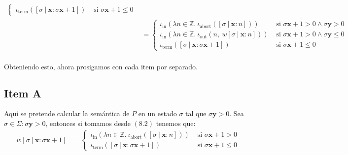 \documentclass{article}
\newcommand{\Z}{\mathbb{Z}}
\newcommand{\x}{\textbf{x}}
\newcommand{\y}{\textbf{y}}
\newcommand{\iterm}[1]{\iota_\text{term}\left(#1\right)}
\newcommand{\iabort}[1]{\iota_\text{abort}\left(#1\right)}
\newcommand{\iout}[2]{\iota_\text{out}\left(#1,\ #2\right)}
\newcommand{\iin}[2]{\iota_\text{in}\left(\lambda #1 \in \Z .\ #2\right)}
\begin{document}
\begin{equation}
\begin{aligned}
\begin{cases}
      \iterm{[\sigma\ |\ \x : \sigma\x+1]} &\text{ si }\sigma\x+1 \leq 0
    \end{cases} \\ 
    &= \begin{cases}
      \iin{n}{\iabort{[\sigma\ |\ \x : n]}} &\text{ si }\sigma\x+1 > 0 \land \sigma\y > 0 \\ 
      \iin{n}{\iout{n}{w [\sigma\ |\ \x : n]}} &\text{ si }\sigma\x+1 > 0 \land \sigma\y \leq 0 \\ 
      \iterm{[\sigma\ |\ \x : \sigma\x+1]} &\text{ si }\sigma\x+1 \leq 0
    \end{cases} \\ 
  \end{aligned}
\end{equation}

Obteniendo esto, ahora prosigamos con cada item por separado.

\subsection*{Item A}
Aquí se pretende calcular la semántica de $P$ en un estado $\sigma$ tal que $\sigma\y > 0$.
Sea $\sigma \in \Sigma : \sigma\y > 0$, entonces si tomamos desde $(8.2)$ tenemos que:
\begin{equation*}
  \begin{aligned}
    w[\sigma\ |\ \x : \sigma\x+1] &= \begin{cases}
      \iin{n}{\iabort{[\sigma\ |\ \x : n]}} &\text{ si }\sigma\x+1 > 0 \\ 
      \iterm{[\sigma\ |\ \x : \sigma\x+1]} &\text{ si }\sigma\x+1 \leq 0
    \end{cases}
  \end{aligned}
\end{equation*}
\end{document}
